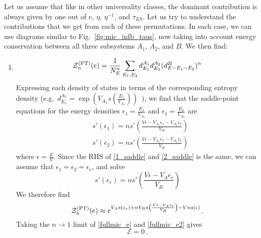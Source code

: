 \documentclass[a4paper,11pt]{article}
\newcommand{\be}{\begin{equation}}
\newcommand{\ee}{\end{equation}}
\newcommand\sE{{\ensuremath{{\mathcal E}}}}
\newcommand\sZ{{\mathcal Z}}
\begin{document}
\begin{enumerate}
\begin{appendix}
Let us assume that like in other universality classes, the dominant contribution is always given by one out of $e$, $\eta$, $\eta^{-1}$, and $\tau_{ES}$. Let us try to understand the contributions that we get from each of these permutations. In each case, we can use diagrams similar to Fig.~\ref{fig:mic_infb_taus}, now taking into account energy conservation between all three subsystems $A_1$, $A_2$, and $B$. We then find: 

\begin{enumerate} 
\item 
 \be 
 \begin{gathered} 
 \sZ_n^{\rm (PT)}(e) = \frac{1}{N_E^n} \sum_{E_{1}, E_{2}} d^{A_1}_{E_1} d^{A_2}_{E_2}(d^B_{E-E_{1}- E_{2}})^n
 \end{gathered} 
 \ee
Expressing each density of states in terms of the corresponding entropy density (e.g.~$d^{A_1}_{E_1} = \exp({V_{A_1} s(\frac{E_1}{V_{A_1}})})$~), we find that the saddle-point equations for the energy densities $\epsilon_1 = \frac{E_1}{V_{A_1}}$ and $\epsilon_1 = \frac{E_2}{V_{A_2}}$ are 
 \begin{align} 
 &s'(\epsilon_1) = n s'\left( \frac{V\epsilon - V_{A_1} \epsilon_1 - V_{A_2}\epsilon_2}{V_B}\right) \label{1_saddle} \\
 &s'(\epsilon_2)= n s'\left( \frac{V\epsilon - V_{A_1} \epsilon_1 - V_{A_2}\epsilon_2}{V_B}\right)
 \label{2_saddle}
 \end{align} 
 where $\epsilon = \frac{E}{V}$. 
Since the RHS of \eqref{1_saddle} and \eqref{2_saddle} is the same, we can assume that $\epsilon_1 = \epsilon_2 = \epsilon_e$, and solve
 \be 
 s'(\epsilon_e) = n s'\left( \frac{ V\epsilon - V_A \epsilon_e}{V_B}\right) \label{fullmic_e}
 \ee
 We therefore find 
\be 
\sZ_n^{\rm(PT)}(e) \approx e^{ V_{A} s(\epsilon_e) + n V_B s\left( \frac{V \epsilon -V_A \epsilon_e}{V_B}\right) -V n s(\epsilon)} \, . \label{fullmic_e2} 
\ee
 Taking the $n\rightarrow 1$ limit of \eqref{fullmic_e} and \eqref{fullmic_e2} gives 
 \be 
 \sE = 0 \, . 
 \ee
 

\end{enumerate}
\end{appendix}
\end{enumerate}
\end{document}
